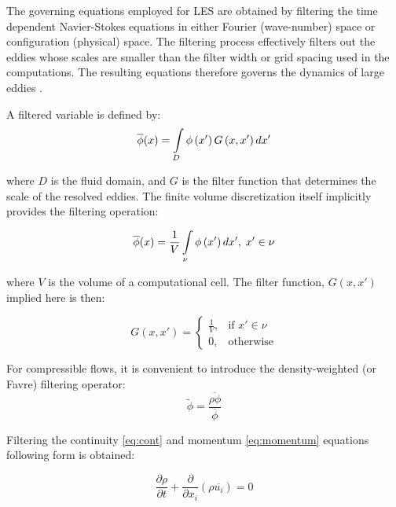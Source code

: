 The governing equations employed for LES are obtained by filtering the time dependent Navier-Stokes equations in either Fourier (wave-number) space or configuration (physical) space. The filtering process effectively filters out the eddies whose scales are smaller than the filter width or grid spacing used in the computations. The resulting equations therefore governs the dynamics of large eddies \citep{fluenttheory}.

A filtered variable is defined by:
\begin{equation} \label{eq:lesfilter}
\overline{\phi}(x) = \int\displaylimits_{D} \phi \left( x' \right) G \left( x, x' \right) dx'
\end{equation}

\noindent where $D$ is the fluid domain, and $G$ is the filter function that determines the scale of the resolved eddies. The finite volume discretization itself implicitly provides the filtering operation:

\begin{equation} \label{eq:lesfilter2}
\overline{\phi}(x) = \frac{1}{V} \int\displaylimits_{\nu} \phi \left( x' \right) dx', \; x' \in \nu
\end{equation}

\noindent where $V$ is the volume of a computational cell. The filter function, $G(x, x')$ implied here is then:

\begin{equation} \label{eq:lesfilter3}
G(x, x') = 
\begin{cases}
	\frac{1}{V}, & \text{if } x'\in \nu \\
	0, & \text{otherwise}
\end{cases}
\end{equation}

For compressible flows, it is convenient to introduce the density-weighted (or Favre) filtering operator:
\begin{equation} \label{eq:favre}
\tilde{\phi} = \frac{\overline{\rho \phi}}{\overline{\phi}}
\end{equation}

Filtering the continuity \ref{eq:cont} and momentum \ref{eq:momentum} equations following form is obtained:

\begin{equation} \label{eq:lescont}
\frac{\partial \rho}{\partial t} + \frac{\partial}{\partial x_i} \left( \rho \overline{u_i} \right) = 0
\end{equation}

